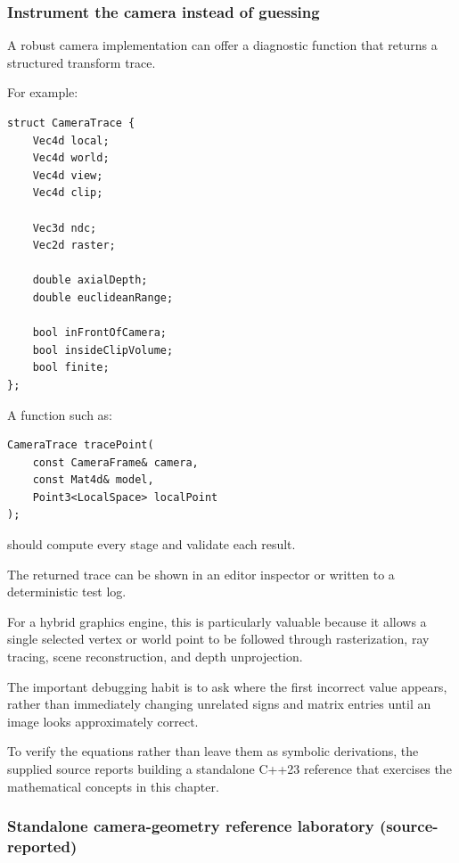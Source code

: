 \subsubsection{Instrument the camera instead of guessing}\label{instrument-the-camera-instead-of-guessing}

A robust camera implementation can offer a diagnostic function that returns a structured transform trace.

For example:

\begin{verbatim}
struct CameraTrace {
    Vec4d local;
    Vec4d world;
    Vec4d view;
    Vec4d clip;

    Vec3d ndc;
    Vec2d raster;

    double axialDepth;
    double euclideanRange;

    bool inFrontOfCamera;
    bool insideClipVolume;
    bool finite;
};
\end{verbatim}

A function such as:

\begin{verbatim}
CameraTrace tracePoint(
    const CameraFrame& camera,
    const Mat4d& model,
    Point3<LocalSpace> localPoint
);
\end{verbatim}

should compute every stage and validate each result.

The returned trace can be shown in an editor inspector or written to a deterministic test log.

For a hybrid graphics engine, this is particularly valuable because it allows a single selected vertex or world point to be followed through rasterization, ray tracing, scene reconstruction, and depth unprojection.

The important debugging habit is to ask where the first incorrect value appears, rather than immediately changing unrelated signs and matrix entries until an image looks approximately correct.

To verify the equations rather than leave them as symbolic derivations, the supplied source reports building a standalone C++23 reference that exercises the mathematical concepts in this chapter.

\subsubsection{Standalone camera-geometry reference laboratory (source-reported)}\label{standalone-camera-geometry-reference-laboratory-source-reported}

